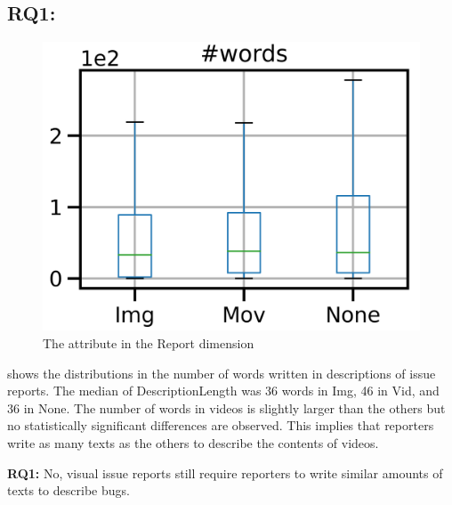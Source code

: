 

\subsection*{RQ1: \RQone{}}
\begin{figure}[t]
    \centering
    \includegraphics[width=0.5\linewidth]{./figures/words.png}
    \caption{The attribute in the Report dimension}
    \label{fig:words}
\end{figure}

 shows the distributions in the number of words 
written in descriptions of issue reports. 
The median of DescriptionLength was 36 words in Img, 
46 in Vid, and 36 in None. 
The number of words in videos is slightly larger than 
the others but no statistically significant differences are observed. 
This implies that reporters write as many texts as the others 
to describe the contents of videos. 

\summarybox
{{\bf RQ1: }{No, visual issue reports still require reporters 
to write similar amounts of texts to describe bugs. 
}}

